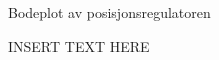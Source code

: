 
%     



%     

\begin{figure}[h]
    \centering
    
    \caption{Bodeplot av posisjonsregulatoren}
    \label{fig:bodeplot}
\end{figure}

\begin{figure}
    \centering
    
    \caption{INSERT TEXT HERE}
    \label{fig:posisjon_P_regulator}
\end{figure}